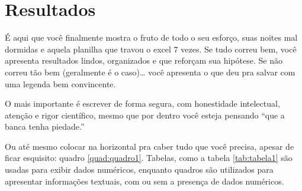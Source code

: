 \chapter{Resultados}
\label{chap:resultados}

É aqui que você finalmente mostra o fruto de todo o seu esforço, suas noites mal dormidas e aquela planilha que travou o excel 7 vezes. Se tudo correu bem, você apresenta resultados lindos, organizados e que reforçam sua hipótese. Se não correu tão bem (geralmente é o caso)… você apresenta o que deu pra salvar com uma legenda bem convincente. 

O mais importante é escrever de forma segura, com honestidade intelectual, atenção e rigor científico, mesmo que por dentro você esteja pensando \enquote{que a banca tenha piedade.}



Ou até mesmo colocar na horizontal pra caber tudo que você precisa, apesar de ficar esquisito: quadro \ref{quad:quadro1}. Tabelas, como a tabela \ref{tab:tabela1} são usadas para exibir dados numéricos, enquanto quadros são utilizados para apresentar informações textuais, com ou sem a presença de dados numéricos.

